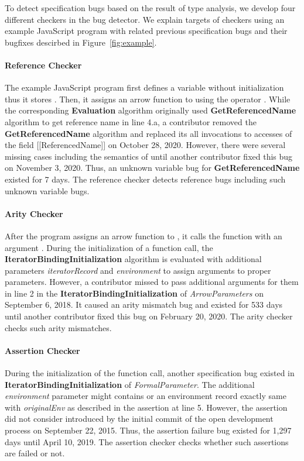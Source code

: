 To detect specification bugs based on the result of type analysis, we develop
four different checkers in the bug detector.  We explain targets of checkers
using an example JavaScript program with related previous specification bugs and
their bugfixes descirbed in Figure~\ref{fig:example}.

\paragraph{Reference Checker} The example JavaScript program first defines a
variable  without initialization thus it stores .
Then, it assigns an arrow function to  using the operator
.  While the corresponding \textbf{Evaluation} algorithm originally
used \textbf{GetReferencedName} algorithm to get reference name in line 4.a, a
contributor removed the \textbf{GetReferencedName} algorithm and replaced its
all invocations to accesses of the field [[ReferencedName]] on October 28, 2020.
However, there were several missing cases including the semantics of
 until another contributor fixed this bug on November 3, 2020.
Thus, an unknown variable bug for \textbf{GetReferencedName} existed for 7 days.
The reference checker detects reference bugs including such unknown variable
bugs.

\paragraph{Arity Checker} After the program assigns an arrow function to
, it calls the function with an argument .  During the
initialization of a function call, the \textbf{IteratorBindingInitialization}
algorithm is evaluated with additional parameters \textit{iteratorRecord} and
\textit{environment} to assign arguments to proper parameters.  However, a
contributor missed to pass additional arguments for them in line 2 in the
\textbf{IteratorBindingInitialization} of \textit{ArrowParameters} on September
6, 2018.  It caused an arity mismatch bug and existed for 533 days until another
contributor fixed this bug on February 20, 2020.  The arity checker checks such
arity mismatches.

\paragraph{Assertion Checker} During the initialization of the function call,
another specification bug existed in \textbf{IteratorBindingInitialization} of
\textit{FormalParameter}.  The additional \textit{environment} parameter might
contains  or an environment record exactly same with
\textit{originalEnv} as described in the assertion at line 5.  However, the
assertion did not consider  introduced by the initial commit
of the open development process on September 22, 2015.  Thus, the assertion
failure bug existed for 1,297 days until April 10, 2019.  The assertion checker
checks whether such assertions are failed or not.

